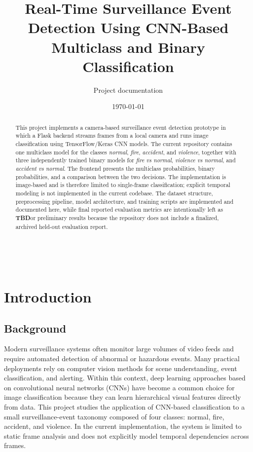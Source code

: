 \documentclass[11pt,a4paper]{article}
\newcommand{\TBD}{\textbf{TBD}}
\begin{document}
\title{\textbf{Real-Time Surveillance Event Detection Using CNN-Based Multiclass and Binary Classification}}\
\author{Project documentation}
\date{\today}
\maketitle

\begin{abstract}
This project implements a camera-based surveillance event detection prototype in which a Flask backend streams frames from a local camera and runs image classification using TensorFlow/Keras CNN models. The current repository contains one multiclass model for the classes \emph{normal}, \emph{fire}, \emph{accident}, and \emph{violence}, together with three independently trained binary models for \emph{fire vs normal}, \emph{violence vs normal}, and \emph{accident vs normal}. The frontend presents the multiclass probabilities, binary probabilities, and a comparison between the two decisions. The implementation is image-based and is therefore limited to single-frame classification; explicit temporal modeling is not implemented in the current codebase. The dataset structure, preprocessing pipeline, model architecture, and training scripts are implemented and documented here, while final reported evaluation metrics are intentionally left as \TBD or preliminary results because the repository does not include a finalized, archived held-out evaluation report.
\end{abstract}

\section{Introduction}
\subsection{Background}
Modern surveillance systems often monitor large volumes of video feeds and require automated detection of abnormal or hazardous events. Many practical deployments rely on computer vision methods for scene understanding, event classification, and alerting. Within this context, deep learning approaches based on convolutional neural networks (CNNs) have become a common choice for image classification because they can learn hierarchical visual features directly from data. This project studies the application of CNN-based classification to a small surveillance-event taxonomy composed of four classes: normal, fire, accident, and violence. In the current implementation, the system is limited to static frame analysis and does not explicitly model temporal dependencies across frames.
\end{document}

